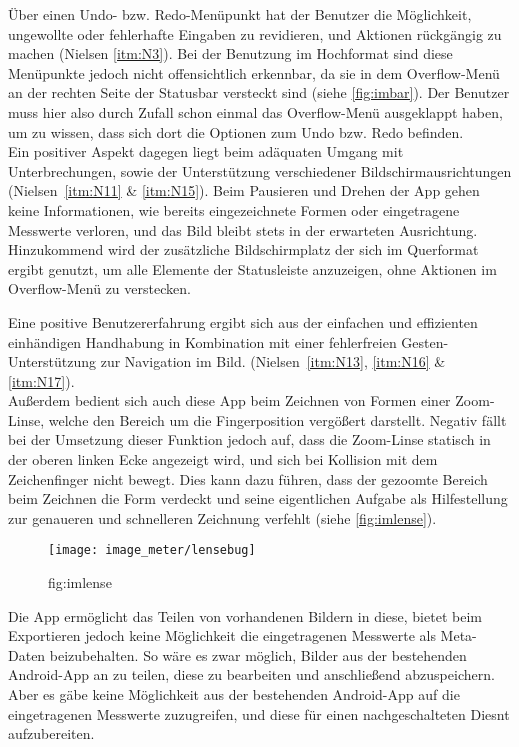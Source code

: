 Über einen Undo- bzw. Redo-Menüpunkt hat der Benutzer die Möglichkeit, ungewollte oder fehlerhafte Eingaben zu revidieren, und Aktionen rückgängig zu machen (Nielsen \autoref{itm:N3}).
Bei der Benutzung im Hochformat sind diese Menüpunkte jedoch nicht offensichtlich erkennbar, da sie in dem Overflow-Menü  an der rechten Seite der Statusbar versteckt sind (siehe \autoref{fig:imbar}).
Der Benutzer muss hier also durch Zufall schon einmal das Overflow-Menü ausgeklappt haben, um zu wissen, dass sich dort die Optionen zum Undo bzw. Redo befinden. \\

Ein positiver Aspekt dagegen liegt beim adäquaten Umgang mit Unterbrechungen, sowie der Unterstützung verschiedener Bildschirmausrichtungen (Nielsen~\autoref{itm:N11} \& \autoref{itm:N15}).
Beim Pausieren und Drehen der App gehen keine Informationen, wie bereits eingezeichnete Formen oder eingetragene Messwerte verloren, und das Bild bleibt stets in der erwarteten Ausrichtung.
Hinzukommend wird der zusätzliche Bildschirmplatz der sich im Querformat ergibt genutzt, um alle Elemente der Statusleiste anzuzeigen, ohne Aktionen im Overflow-Menü zu verstecken.

Eine positive Benutzererfahrung ergibt sich aus der einfachen und effizienten einhändigen Handhabung in Kombination mit einer fehlerfreien Gesten-Unterstützung zur Navigation im Bild. (Nielsen~\autoref{itm:N13}, \autoref{itm:N16} \& \autoref{itm:N17}). \\

Außerdem bedient sich auch diese App beim Zeichnen von Formen einer Zoom-Linse, welche den Bereich um die Fingerposition vergößert darstellt.
Negativ fällt bei der Umsetzung dieser Funktion jedoch auf, dass die Zoom-Linse statisch in der oberen linken Ecke angezeigt wird, und sich bei Kollision mit dem Zeichenfinger nicht bewegt.
Dies kann dazu führen, dass der gezoomte Bereich beim Zeichnen die Form verdeckt und seine eigentlichen Aufgabe als Hilfestellung zur genaueren und schnelleren Zeichnung verfehlt (siehe \autoref{fig:imlense}). \\

\begin{wrapfigure}{R}{0.5\textwidth}
  \centering
  \texttt{[image: image\_meter/lensebug]}
  \caption{fig:imlense}
  \label{Zoom-Linse verdeckt Zeichenbereich}
\end{wrapfigure}

Die App ermöglicht das Teilen von vorhandenen Bildern in diese, bietet beim Exportieren jedoch keine Möglichkeit die eingetragenen Messwerte als Meta-Daten beizubehalten.
So wäre es zwar möglich, Bilder aus der bestehenden Android-App an \im{} zu teilen, diese zu bearbeiten und anschließend abzuspeichern. 
Aber es gäbe keine Möglichkeit aus der bestehenden Android-App auf die eingetragenen Messwerte zuzugreifen, und diese für einen nachgeschalteten Diesnt aufzubereiten. \\


